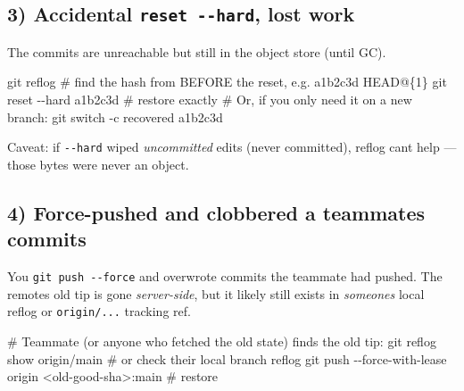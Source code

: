 \documentclass[11pt]{article}
\newenvironment{Shaded}{\begin{snugshade}}{\end{snugshade}}
\newcommand{\AttributeTok}[1]{\textcolor[rgb]{0.16,0.50,0.73}{#1}}
\newcommand{\CommentTok}[1]{\textcolor[rgb]{0.48,0.49,0.49}{#1}}
\newcommand{\FunctionTok}[1]{\textcolor[rgb]{0.56,0.27,0.68}{#1}}
\newcommand{\NormalTok}[1]{\textcolor[rgb]{0.81,0.81,0.76}{#1}}
\newcommand{\OperatorTok}[1]{\textcolor[rgb]{0.81,0.81,0.76}{#1}}
\begin{document}
\subsection{\texorpdfstring{3) Accidental \texttt{reset\ -\/-hard}, lost work}{3) Accidental reset -\/-hard, lost work}}\label{3-accidental-reset---hard-lost-work}

The commits are unreachable but still in the object store (until GC).


\begin{Shaded}
\begin{Highlighting}[]
\FunctionTok{git}\NormalTok{ reflog                        }\CommentTok{\# find the hash from BEFORE the reset, e.g. a1b2c3d HEAD@\{1\}}
\FunctionTok{git}\NormalTok{ reset }\AttributeTok{{-}{-}hard}\NormalTok{ a1b2c3d          }\CommentTok{\# restore exactly}
\CommentTok{\# Or, if you only need it on a new branch:}
\FunctionTok{git}\NormalTok{ switch }\AttributeTok{{-}c}\NormalTok{ recovered a1b2c3d}
\end{Highlighting}
\end{Shaded}

Caveat: if \texttt{-\/-hard} wiped \emph{uncommitted} edits (never committed), reflog can\textquotesingle t help --- those bytes were never an object.

\subsection{4) Force-pushed and clobbered a teammate\textquotesingle s commits}\label{4-force-pushed-and-clobbered-a-teammates-commits}

You \texttt{git\ push\ -\/-force} and overwrote commits the teammate had pushed. The remote\textquotesingle s old tip is gone \emph{server-side}, but it likely still exists in \emph{someone\textquotesingle s} local reflog or \texttt{origin/...} tracking ref.


\begin{Shaded}
\begin{Highlighting}[]
\CommentTok{\# Teammate (or anyone who fetched the old state) finds the old tip:}
\FunctionTok{git}\NormalTok{ reflog show origin/main          }\CommentTok{\# or check their local branch reflog}
\FunctionTok{git}\NormalTok{ push }\AttributeTok{{-}{-}force{-}with{-}lease}\NormalTok{ origin }\OperatorTok{\textless{}}\NormalTok{old{-}good{-}sha}\OperatorTok{\textgreater{}}\NormalTok{:main   }\CommentTok{\# restore}
\end{Highlighting}
\end{Shaded}
\end{document}
